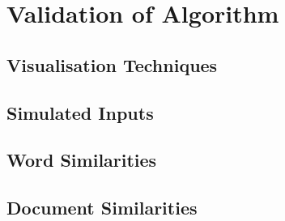 \chapter{Validation of Algorithm}
\section{Visualisation Techniques}
\section{Simulated Inputs}
\section{Word Similarities}
\section{Document Similarities}